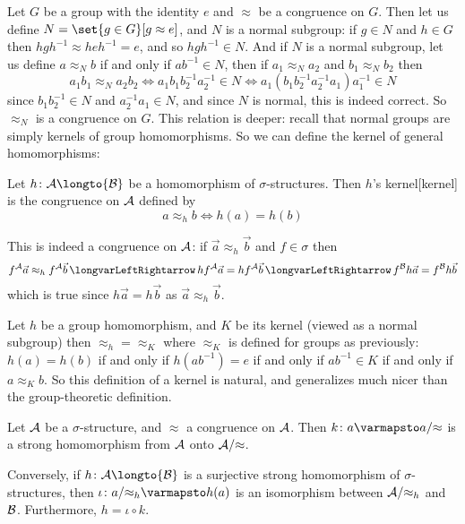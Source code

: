 \edefn

Let $G$ be a group with the identity $e$ and $\approx$ be a congruence on $G$.
Then let us define $N=\set{g\in G}[g\approx e]$, and $N$ is a normal subgroup: if $g\in N$ and $h\in G$ then $hgh^{-1}\approx heh^{-1}=e$, and so $hgh^{-1}\in N$.
And if $N$ is a normal subgroup, let us define $a\approx_N b$ if and only if $ab^{-1}\in N$, then if $a_1\approx_N a_2$ and $b_1\approx_N b_2$ then
$$ a_1b_1 \approx_N a_2b_2 \iff a_1b_1b_2^{-1}a_2^{-1}\in N \iff a_1(b_1b_2^{-1}a_2^{-1}a_1)a_1^{-1}\in N $$
since $b_1b_2^{-1}\in N$ and $a_2^{-1}a_1\in N$, and since $N$ is normal, this is indeed correct.
So $\approx_N$ is a congruence on $G$.
This relation is deeper: recall that normal groups are simply kernels of group homomorphisms.
So we can define the kernel of general homomorphisms:

\bdefn

    Let $h\colon{\cal A}\longto{\cal B}$ be a homomorphism of $\sigma$-structures.
    Then $h$'s {\emphcolor kernel}[kernel] is the congruence on ${\cal A}$ defined by
    $$ a\approx_h b \iff h(a)=h(b) $$

\edefn

This is indeed a congruence on ${\cal A}$: if $\vec a\approx_h\vec b$ and $f\in\sigma$ then
$$ f^{\cal A}\vec a\approx_h f^{\cal A}\vec b \iff hf^{\cal A}\vec a = hf^{\cal A}\vec b \iff f^{\cal B}h\vec a = f^{\cal B}h\vec b $$
which is true since $h\vec a=h\vec b$ as $\vec a\approx_h\vec b$.

Let $h$ be a group homomorphism, and $K$ be its kernel (viewed as a normal subgroup) then $\approx_h=\approx_K$ where $\approx_K$ is defined for groups as previously: $h(a)=h(b)$ if and only if
$h(ab^{-1})=e$ if and only if $ab^{-1}\in K$ if and only if $a\approx_Kb$.
So this definition of a kernel is natural, and generalizes much nicer than the group-theoretic definition.

\bthrm[title=The Isomorphism Theorem, name=isothrm]

    \benum
        \item Let ${\cal A}$ be a $\sigma$-structure, and $\approx$ a congruence on ${\cal A}$.
        Then $k\colon a\varmapsto a/{\approx}$ is a strong homomorphism from ${\cal A}$ onto ${\cal A}/{\approx}$.
        \item Conversely, if $h\colon{\cal A}\longto{\cal B}$ is a surjective strong homomorphism of $\sigma$-structures, then $\iota\colon a/{\approx_h}\varmapsto h(a)$ is an isomorphism between
        ${\cal A}/{\approx_h}$ and ${\cal B}$.
        Furthermore, $h=\iota\circ k$.
    \eenum

